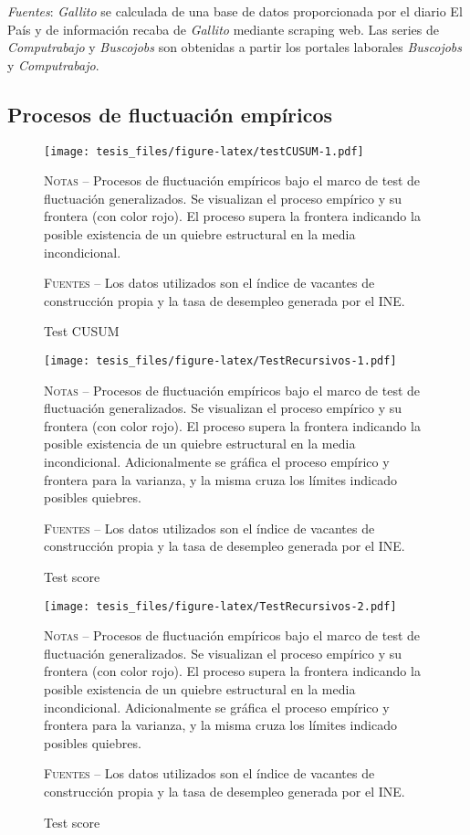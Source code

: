 \documentclass[12pt,oneside]{reedthesis}
\makeatletter
\def\maxwidth{ %
  \ifdim\Gin@nat@width>\linewidth
    \linewidth
  \else
    \Gin@nat@width
  \fi
}
\makeatother
\begin{document}
\begin{table}
\begin{threeparttable}
\begin{tablenotes}
\textit{Fuentes}: \textit{Gallito} se calculada de una base de datos proporcionada por el diario El País y de información recaba de \textit{Gallito} mediante scraping web. Las series de \textit{Computrabajo} y \textit{Buscojobs} son obtenidas a partir los portales laborales \textit{Buscojobs} y \textit{Computrabajo}.
\end{tablenotes}
\end{threeparttable}
\end{table}
\hypertarget{efpAnexo}{%
\subsection{Procesos de fluctuación empíricos}\label{efpAnexo}}
\begin{figure}
\texttt{[image: tesis\_files/figure-latex/testCUSUM-1.pdf]}
\caption{Test CUSUM}\label{fig:testCUSUM}\textsc{}

\footnotesize\textsc{Notas} -- Procesos de fluctuación empíricos bajo el marco de test de fluctuación generalizados. Se visualizan el proceso empírico y su frontera (con color rojo). El proceso supera la frontera indicando la posible existencia de un quiebre estructural en la media incondicional.

\textsc{Fuentes} -- Los datos utilizados son el índice de vacantes de construcción propia y la tasa de desempleo generada por el INE.
\end{figure}
\begin{figure}
\texttt{[image: tesis\_files/figure-latex/TestRecursivos-1.pdf]}
\caption{Test score}\label{fig:TestRecursivos}\textsc{}

\footnotesize\textsc{Notas} -- Procesos de fluctuación empíricos bajo el marco de test de fluctuación generalizados. Se visualizan el proceso empírico y su frontera (con color rojo). El proceso supera la frontera indicando la posible existencia de un quiebre estructural en la media incondicional. Adicionalmente se gráfica el proceso empírico y frontera para la varianza, y la misma cruza los límites indicado posibles quiebres.

\textsc{Fuentes} -- Los datos utilizados son el índice de vacantes de construcción propia y la tasa de desempleo generada por el INE.
\end{figure}
\begin{figure}
\texttt{[image: tesis\_files/figure-latex/TestRecursivos-2.pdf]}
\caption{Test score}\label{fig:TestRecursivos}\textsc{}

\footnotesize\textsc{Notas} -- Procesos de fluctuación empíricos bajo el marco de test de fluctuación generalizados. Se visualizan el proceso empírico y su frontera (con color rojo). El proceso supera la frontera indicando la posible existencia de un quiebre estructural en la media incondicional. Adicionalmente se gráfica el proceso empírico y frontera para la varianza, y la misma cruza los límites indicado posibles quiebres.

\textsc{Fuentes} -- Los datos utilizados son el índice de vacantes de construcción propia y la tasa de desempleo generada por el INE.
\end{figure}
\end{document}
